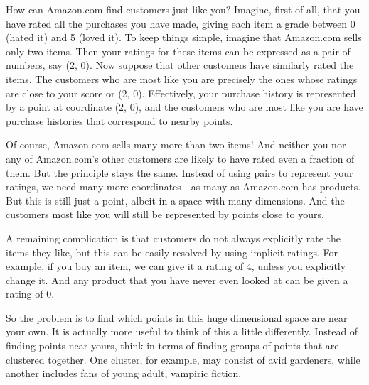 How can Amazon.com find customers just like you?  Imagine, first of all, that
you have rated all the purchases you have made, giving each item a grade between
0 (hated it) and 5 (loved it).  To keep things simple, imagine that Amazon.com
sells only two items.  Then your ratings for these items can be expressed as
a pair of numbers, say (2, 0).  Now suppose that other customers have similarly
rated the items.  The customers who are most like you are precisely the ones
whose ratings are close to your score or (2, 0).  Effectively, your purchase
history is represented by a point at coordinate (2, 0), and the customers who
are most like you are have purchase histories that correspond to nearby points.

Of course, Amazon.com sells many more than two items!  And neither you nor any
of Amazon.com's other customers are likely to have rated even a fraction of them.
But the principle stays the same.  Instead of using pairs to represent your
ratings, we need many more coordinates---as many as Amazon.com has products.
But this is still just a point, albeit in a space with many dimensions.  And the
customers most like you will still be represented by points close to yours.

A remaining complication is that customers do not always explicitly rate the
items they like, but this can be easily resolved by using implicit ratings.
For example, if you buy an item, we can give it a rating of 4, unless you
explicitly change it.  And any product that you have never even looked at
can be given a rating of 0.

So the problem is to find which points in this huge dimensional space are near
your own.  It is actually more useful to think of this a little differently.
Instead of finding points near yours, think in terms of finding groups of
points that are clustered together.  One cluster, for example, may consist of
avid gardeners, while another includes fans of young adult, vampiric fiction.


